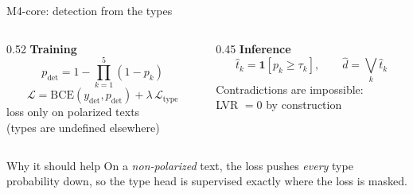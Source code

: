 \begin{frame}{M4-core: detection from the types}
\begin{columns}[T]
\begin{column}{0.52\textwidth}
\textbf{Training}
\[
p_{\text{det}} = 1 - \prod_{k=1}^{5}(1 - p_k)
\]
\[
\mathcal{L} = \mathrm{BCE}(y_{\text{det}}, p_{\text{det}})
 + \lambda\,\mathcal{L}_{\text{type}}
\]
\small \TYPE{} loss only on polarized texts\\
(types are undefined elsewhere)
\end{column}
\begin{column}{0.45\textwidth}
\textbf{Inference}
\[
\hat t_k = \mathbf{1}[p_k \ge \tau_k], \qquad
\hat d = \bigvee_k \hat t_k
\]
\small Contradictions are impossible:\\ LVR $= 0$ by construction
\end{column}
\end{columns}
\vspace{8pt}
\begin{block}{Why it should help}
On a \emph{non-polarized} text, the \DET{} loss pushes \emph{every} type
probability down, so the type head is supervised exactly where the \TYPE{}
loss is masked.
\end{block}
\end{frame}

